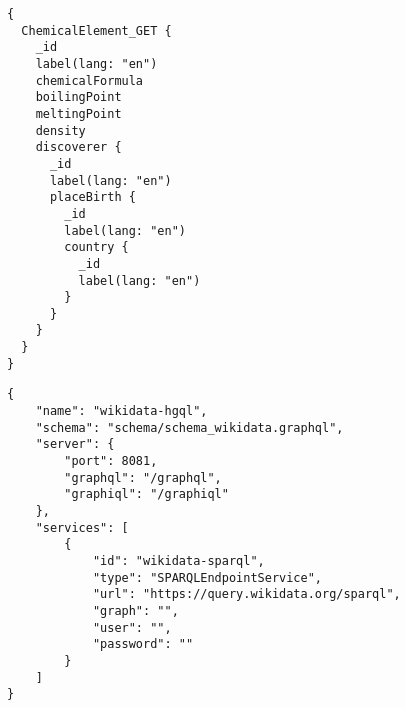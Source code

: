 \begin{minipage}{\linewidth}
\begin{lstlisting}[label=listing:listing29, caption={Query}]
{
  ChemicalElement_GET {
    _id
    label(lang: "en")
    chemicalFormula
    boilingPoint
    meltingPoint
    density
    discoverer {
      _id
      label(lang: "en")
      placeBirth {
        _id
        label(lang: "en")
        country {
          _id
          label(lang: "en")
        }
      }
    }
  }
}
\end{lstlisting}
\end{minipage}

\begin{minipage}{\linewidth}
\begin{lstlisting}[label=listing:listing30, caption={Configuration}]
{
    "name": "wikidata-hgql",
    "schema": "schema/schema_wikidata.graphql",
    "server": {
        "port": 8081,
        "graphql": "/graphql",
        "graphiql": "/graphiql"
    },
    "services": [
        {
            "id": "wikidata-sparql",
            "type": "SPARQLEndpointService",
            "url": "https://query.wikidata.org/sparql",
            "graph": "",
            "user": "",
            "password": ""
        }
    ]
}
\end{lstlisting}
\end{minipage}

